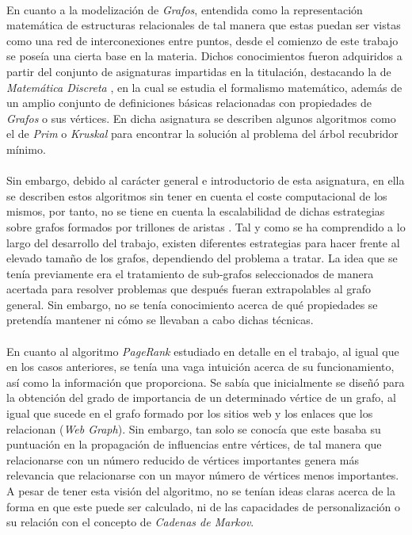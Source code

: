 \documentclass{subfiles}
\begin{document}
      \paragraph{}
      En cuanto a la modelización de \emph{Grafos}, entendida como la representación matemática de estructuras relacionales de tal manera que estas puedan ser vistas como una red de interconexiones entre puntos, desde el comienzo de este trabajo se poseía una cierta base en la materia. Dichos conocimientos fueron adquiridos a partir del conjunto de asignaturas impartidas en la titulación, destacando la de \emph{Matemática Discreta} \cite{matematicaDiscreta2016notes}, en la cual se estudia el formalismo matemático, además de un amplio conjunto de definiciones básicas relacionadas con propiedades de \emph{Grafos} o sus vértices. En dicha asignatura se describen algunos algoritmos como el de \emph{Prim} o \emph{Kruskal} para encontrar la solución al problema del árbol recubridor mínimo.

      \paragraph{}
      Sin embargo, debido al carácter general e introductorio de esta asignatura, en ella se describen estos algoritmos sin tener en cuenta el coste computacional de los mismos, por tanto, no se tiene en cuenta la escalabilidad de dichas estrategias sobre grafos formados por trillones de aristas \cite{ching2015one}. Tal y como se ha comprendido a lo largo del desarrollo del trabajo, existen diferentes estrategias para hacer frente al elevado tamaño de los grafos, dependiendo del problema a tratar. La idea que se tenía previamente era el tratamiento de sub-grafos seleccionados de manera acertada para resolver problemas que después fueran extrapolables al grafo general. Sin embargo, no se tenía conocimiento acerca de qué propiedades se pretendía mantener ni cómo se llevaban a cabo dichas técnicas.

      \paragraph{}
      En cuanto al algoritmo \emph{PageRank} estudiado en detalle en el trabajo, al igual que en los casos anteriores, se tenía una vaga intuición acerca de su funcionamiento, así como la información que proporciona. Se sabía que inicialmente se diseñó para la obtención del grado de importancia de un determinado vértice de un grafo, al igual que sucede en el grafo formado por los sitios web y los enlaces que los relacionan (\emph{Web Graph}). Sin embargo, tan solo se conocía que este basaba su puntuación en la propagación de influencias entre vértices, de tal manera que relacionarse con un número reducido de vértices importantes genera más relevancia que relacionarse con un mayor número de vértices menos importantes. A pesar de tener esta visión del algoritmo, no se tenían ideas claras acerca de la forma en que este puede ser calculado, ni de las capacidades de personalización o su relación con el concepto de \emph{Cadenas de Markov}.
\end{document}
